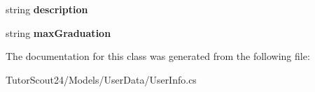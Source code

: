 \begin{DoxyCompactItemize}
\item 
\mbox{\label{class_tutor_scout24_1_1_models_1_1_user_data_1_1_user_info_ac7da0fdbd9375b21bb2e243a9b527c3c}} 
string {\bfseries description}
\item 
\mbox{\label{class_tutor_scout24_1_1_models_1_1_user_data_1_1_user_info_a9b1c0510f3654cb2c5bb6e943da6ccad}} 
string {\bfseries max\+Graduation}
\end{DoxyCompactItemize}


The documentation for this class was generated from the following file\+:\begin{DoxyCompactItemize}
\item 
Tutor\+Scout24/\+Models/\+User\+Data/User\+Info.\+cs\end{DoxyCompactItemize}
